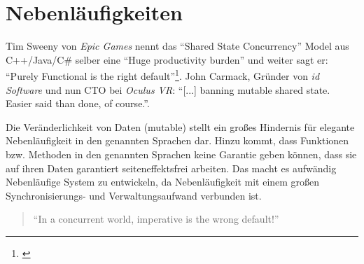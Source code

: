 \section{Nebenläufigkeiten}

Tim Sweeny von \textit{Epic Games} nennt das "`Shared State Concurrency"' Model aus C++/Java/C\# selber eine "`Huge productivity burden"' und weiter sagt er: "`Purely Functional is the right default"'\footnote{\cite[Vgl.][Seite 42 u. Seite 56]{Sweeney2006}\label{note:sweeney-mainstream}}. John Carmack, Gründer von \textit{id Software} und nun CTO bei \textit{Oculus VR}: "`[...] banning mutable shared state. Easier said than done, of course."'.

Die Veränderlichkeit von Daten (mutable) stellt ein großes Hindernis für elegante Nebenläufigkeit in den genannten Sprachen dar. Hinzu kommt, dass Funktionen bzw. Methoden in den genannten Sprachen keine Garantie geben können, dass sie auf ihren Daten garantiert seiteneffektsfrei arbeiten. Das macht es aufwändig Nebenläufige System zu entwickeln, da Nebenläufigkeit mit einem großen Synchronisierungs- und Verwaltungsaufwand verbunden ist.

\begin{quote}
"`In a concurrent world, imperative is the wrong default!"'
\end{quote}


